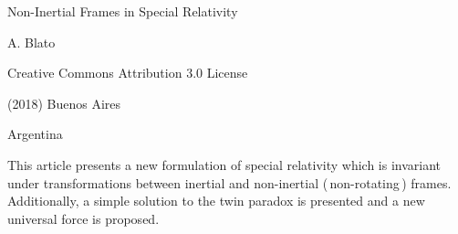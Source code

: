 \documentclass[10pt,fleqn]{article}
\begin{document}
\begin{center}

{\fontsize{10.50}{10.50}\selectfont \sc Non-Inertial Frames in Special Relativity}

\bigskip \medskip

{\fontsize{9.60}{9.60}\selectfont A. Blato}

\bigskip \medskip

\small

Creative Commons Attribution 3.0 License

\smallskip

(2018) Buenos Aires

\medskip

Argentina

\smallskip

\bigskip \medskip

\parbox{86.40mm}{This article presents a new formulation of special relativity which is invariant under transformations between inertial and non-inertial (\,non-rotating\,) frames. Additionally, a simple solution to the twin paradox is presented and a new universal force is proposed.}

\end{center}

\normalsize

\vspace{-1.50em}

\par {}

\bigskip \smallskip
\end{document}
